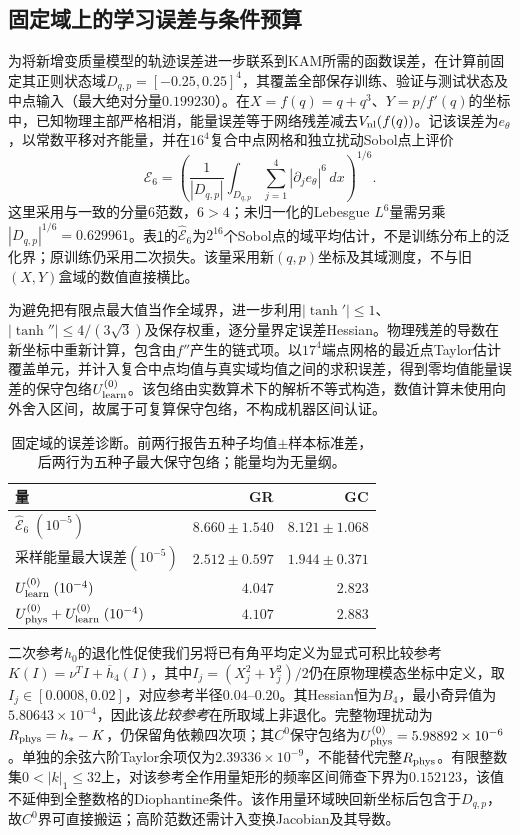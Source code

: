 \subsection{固定域上的学习误差与条件预算}

为将新增变质量模型的轨迹误差进一步联系到KAM所需的函数误差，在计算前固定其正则状态域$D_{q,p}=[-0.25,0.25]^4$，其覆盖全部保存训练、验证与测试状态及中点输入（最大绝对分量$0.199230$）。在$X=f(q)=q+q^3$、$Y=p/f'(q)$的坐标中，已知物理主部严格相消，能量误差等于网络残差减去$V_{\rm nl}(f(q))$。记该误差为$e_\theta$，以常数平移对齐能量，并在$16^4$复合中点网格和独立扰动Sobol点上评价
\[
 \mathcal E_6=\left(\frac1{|D_{q,p}|}\int_{D_{q,p}}
       \sum_{j=1}^4|\partial_j e_\theta|^6\,dx\right)^{1/6}.
\]
这里采用与\citet[式(8)]{Chen2022}一致的分量$6$范数，$6>4$；未归一化的Lebesgue $L^6$量需另乘$|D_{q,p}|^{1/6}=0.629961$。表\ref{tab:kam_error_bridge}的$\widehat{\mathcal E}_6$为$2^{16}$个Sobol点的域平均估计，不是训练分布上的泛化界；原训练仍采用二次损失。该量采用新$(q,p)$坐标及其域测度，不与旧$(X,Y)$盒域的数值直接横比。

为避免把有限点最大值当作全域界，进一步利用$|\tanh'|\leq1$、$|\tanh''|\leq4/(3\sqrt3)$及保存权重，逐分量界定误差Hessian。物理残差的导数在新坐标中重新计算，包含由$f''$产生的链式项。以$17^4$端点网格的最近点Taylor估计覆盖单元，并计入复合中点均值与真实域均值之间的求积误差，得到零均值能量误差的保守包络$U_{\rm learn}^{(0)}$。该包络由实数算术下的解析不等式构造，数值计算未使用向外舍入区间，故属于可复算保守包络，不构成机器区间认证。

\begin{table}[t]
\centering\small
\caption{固定域的误差诊断。前两行报告五种子均值$\pm$样本标准差，后两行为五种子最大保守包络；能量均为无量纲。}
\label{tab:kam_error_bridge}
\begin{tabular}{lrr}
\toprule
量 & GR & GC\\
\midrule
$\widehat{\mathcal E}_6\;(10^{-5})$ & $8.660\pm1.540$ & $8.121\pm1.068$\\
采样能量最大误差$(10^{-5})$ & $2.512\pm0.597$ & $1.944\pm0.371$\\
$U_{\rm learn}^{(0)}\;(10^{-4})$ & $4.047$ & $2.823$\\
$U_{\rm phys}^{(0)}+U_{\rm learn}^{(0)}\;(10^{-4})$ & $4.107$ & $2.883$\\
\bottomrule
\end{tabular}
\end{table}

二次参考$h_0$的退化性促使我们另将已有角平均定义为显式可积比较参考$K(I)=\nu^TI+\overline h_4(I)$，其中$I_j=(X_j^2+Y_j^2)/2$仍在原物理模态坐标中定义，取$I_j\in[0.0008,0.02]$，对应参考半径$0.04$--$0.20$。其Hessian恒为$B_4$，最小奇异值为$5.80643\times10^{-4}$，因此该\emph{比较参考}在所取域上非退化。完整物理扰动为$R_{\rm phys}=h_*-K$，仍保留角依赖四次项；其$C^0$保守包络为$U_{\rm phys}^{(0)}=5.98892\times10^{-6}$。单独的余弦六阶Taylor余项仅为$2.39336\times10^{-9}$，不能替代完整$R_{\rm phys}$。有限整数集$0<|k|_1\leq32$上，对该参考全作用量矩形的频率区间筛查下界为$0.152123$，该值不延伸到全整数格的Diophantine条件。该作用量环域映回新坐标后包含于$D_{q,p}$，故$C^0$界可直接搬运；高阶范数还需计入变换Jacobian及其导数。

